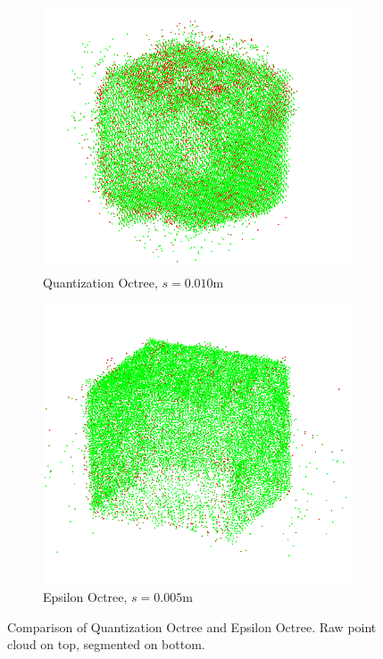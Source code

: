 \begin{figure}[h!tb]
    \begin{subfigure}[b]{0.4\textwidth}
        \centering
        \includegraphics[width=0.9\linewidth]{images/eval-clouds-quant-segmented2}
        \caption{Quantization Octree, $s=0.010$m}
    \end{subfigure}%
    \begin{subfigure}[b]{0.4\textwidth}
        \centering
        \includegraphics[width=0.9\linewidth]{images/eval-clouds-epsilon-segmented}
        \caption{Epsilon Octree, $s=0.005$m}
        \label{fig:octrees-compairison-epsilon}
    \end{subfigure}%

    \caption{Comparison of Quantization Octree and Epsilon Octree. Raw point cloud on top, segmented on bottom.}
    \label{fig:octrees-compairison}
\end{figure}

